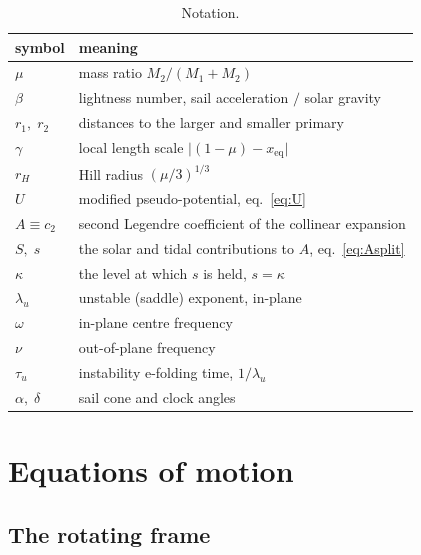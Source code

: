 \documentclass[11pt,a4paper]{article}
\begin{document}
\begin{table}[t]
  \centering
  \caption{Notation.}
  \label{tab:notation}
  \begin{tabular}{ll}
    \toprule
    symbol & meaning \\
    \midrule
    $\mu$                    & mass ratio $M_2/(M_1+M_2)$ \\
    $\beta$                  & lightness number, sail acceleration $/$ solar gravity \\
    $r_1,\;r_2$              & distances to the larger and smaller primary \\
    $\gamma$                 & local length scale $\lvert(1-\mu)-x_{\mathrm{eq}}\rvert$ \\
    $r_H$                    & Hill radius $(\mu/3)^{1/3}$ \\
    $U$                      & modified pseudo-potential, eq.~\eqref{eq:U} \\
    $A\equiv c_2$            & second Legendre coefficient of the collinear expansion \\
    $S,\;s$                  & the solar and tidal contributions to $A$, eq.~\eqref{eq:Asplit} \\
    $\kappa$                 & the level at which $s$ is held, $s=\kappa$ \\
    $\lambda_u$              & unstable (saddle) exponent, in-plane \\
    $\omega$                 & in-plane centre frequency \\
    $\nu$                    & out-of-plane frequency \\
    $\tau_u$                 & instability e-folding time, $1/\lambda_u$ \\
    $\alpha,\;\delta$        & sail cone and clock angles \\
    \bottomrule
  \end{tabular}
\end{table}

\section{Equations of motion}\label{sec:eom}

\subsection{The rotating frame}
\end{document}
